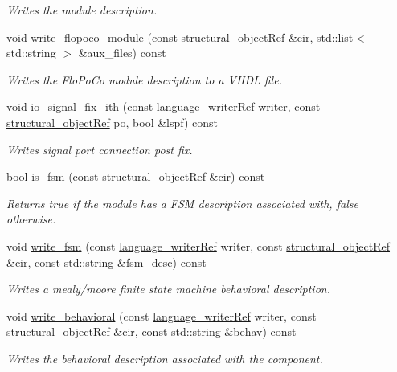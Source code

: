 \begin{DoxyCompactItemize}
\begin{DoxyCompactList}\small\item\em Writes the module description. \end{DoxyCompactList}\item 
void \hyperlink{classHDL__manager_aea3affebb889f7cdfbcbf62a6473b9b2}{write\+\_\+flopoco\+\_\+module} (const \hyperlink{structural__objects_8hpp_a8ea5f8cc50ab8f4c31e2751074ff60b2}{structural\+\_\+object\+Ref} \&cir, std\+::list$<$ std\+::string $>$ \&aux\+\_\+files) const
\begin{DoxyCompactList}\small\item\em Writes the Flo\+Po\+Co module description to a V\+H\+DL file. \end{DoxyCompactList}\item 
void \hyperlink{classHDL__manager_a61d257b049c62e280a5867a06f4f4e2c}{io\+\_\+signal\+\_\+fix\+\_\+ith} (const \hyperlink{language__writer_8hpp_ab5bb59a651cbff3f3c83b0f51c0b0b71}{language\+\_\+writer\+Ref} writer, const \hyperlink{structural__objects_8hpp_a8ea5f8cc50ab8f4c31e2751074ff60b2}{structural\+\_\+object\+Ref} po, bool \&lspf) const
\begin{DoxyCompactList}\small\item\em Writes signal port connection post fix. \end{DoxyCompactList}\item 
bool \hyperlink{classHDL__manager_a75c6d3979d2d925fcbc76cbe9c9e5614}{is\+\_\+fsm} (const \hyperlink{structural__objects_8hpp_a8ea5f8cc50ab8f4c31e2751074ff60b2}{structural\+\_\+object\+Ref} \&cir) const
\begin{DoxyCompactList}\small\item\em Returns true if the module has a F\+SM description associated with, false otherwise. \end{DoxyCompactList}\item 
void \hyperlink{classHDL__manager_a87ef5b67f3ed867fff727d9b3f161795}{write\+\_\+fsm} (const \hyperlink{language__writer_8hpp_ab5bb59a651cbff3f3c83b0f51c0b0b71}{language\+\_\+writer\+Ref} writer, const \hyperlink{structural__objects_8hpp_a8ea5f8cc50ab8f4c31e2751074ff60b2}{structural\+\_\+object\+Ref} \&cir, const std\+::string \&fsm\+\_\+desc) const
\begin{DoxyCompactList}\small\item\em Writes a mealy/moore finite state machine behavioral description. \end{DoxyCompactList}\item 
void \hyperlink{classHDL__manager_aa30e28273b99d8dbf65bceae373a963d}{write\+\_\+behavioral} (const \hyperlink{language__writer_8hpp_ab5bb59a651cbff3f3c83b0f51c0b0b71}{language\+\_\+writer\+Ref} writer, const \hyperlink{structural__objects_8hpp_a8ea5f8cc50ab8f4c31e2751074ff60b2}{structural\+\_\+object\+Ref} \&cir, const std\+::string \&behav) const
\begin{DoxyCompactList}\small\item\em Writes the behavioral description associated with the component. \end{DoxyCompactList}\end{DoxyCompactItemize}
